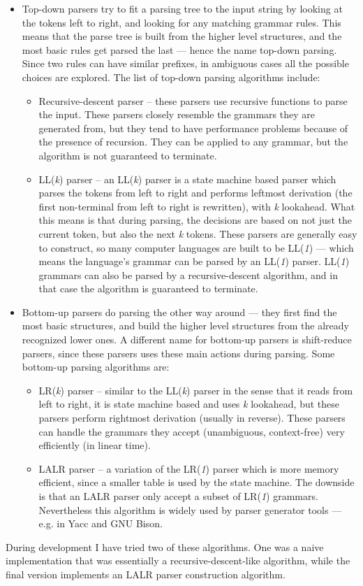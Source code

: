 \begin{itemize}
\item Top-down parsers try to fit a parsing tree to the input string by looking at the tokens left to right, and looking for any matching grammar rules. This means that the parse tree is built from the higher level structures, and the most basic rules get parsed the last --- hence the name top-down parsing. Since two rules can have similar prefixes, in ambiguous cases all the possible choices are explored. The list of top-down parsing algorithms include:
\begin{itemize}
\item Recursive-descent parser \cite{redziejowski2007parsing} -- these parsers use recursive functions to parse the input. These parsers closely resemble the grammars they are generated from, but they tend to have performance problems because of the presence of recursion. They can be applied to any grammar, but the algorithm is not guaranteed to terminate.
\item LL(\textit{k}) parser \cite{sippu2013parsing} -- an LL(\textit{k}) parser is a state machine based parser which parses the tokens from left to right and performs leftmost derivation (the first non-terminal from left to right is rewritten), with \textit{k} lookahead. What this means is that during parsing, the decisions are based on not just the current token, but also the next \textit{k} tokens. These parsers are generally easy to construct, so many computer languages are built to be LL(\textit{1}) --- which means the language's grammar can be parsed by an LL(\textit{1}) parser. LL(\textit{1}) grammars can also be parsed by a recursive-descent algorithm, and in that case the algorithm is guaranteed to terminate. 
\end{itemize}
\item Bottom-up parsers do parsing the other way around --- they first find the most basic structures, and build the higher level structures from the already recognized lower ones. A different name for bottom-up parsers is shift-reduce parsers, since these parsers uses these main actions during parsing. Some bottom-up parsing algorithms are:
\begin{itemize}
\item LR(\textit{k}) parser \cite{sippu2013parsing} -- similar to the LL(\textit{k}) parser in the sense that it reads from left to right, it is state machine based and uses \textit{k} lookahead, but these parsers perform rightmost derivation (usually in reverse). These parsers can handle the grammars they accept (unambiguous, context-free) very efficiently (in linear time). 
\item LALR parser -- a variation of the LR(\textit{1}) parser which is more memory efficient, since a smaller table is used by the state machine. The downside is that an LALR parser only accept a subset of LR(\textit{1}) grammars. Nevertheless this algorithm is widely used by parser generator tools --- e.g. in Yacc and GNU Bison.  
\end{itemize}
\end{itemize}
During development I have tried two of these algorithms. One was a naive implementation that was essentially a recursive-descent-like algorithm, while the final version implements an LALR parser construction algorithm. 
